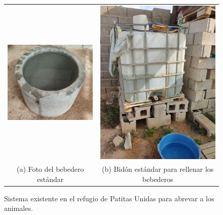 \documentclass[12pt]{article}
\begin{document}
	\pagebreak
	
	\begin{figure}[h!]
		\begin{center}
			\begin{tabular}{cc}
				\includegraphics[width=55mm]{img/bebedero_refugio.jpg} &   \includegraphics[width=60mm]{img/bidon_refugio.jpg} \\
				(a) Foto del bebedero estándar & (b) Bidón estándar para rellenar los bebederos\\[6pt]
			\end{tabular}
			\caption{Sistema existente en el refugio de Patitas Unidas para abrevar a los animales. }
			\label{fig: sistema bebedero refugio.}
		\end{center}
	\end{figure}
	
\end{document}
